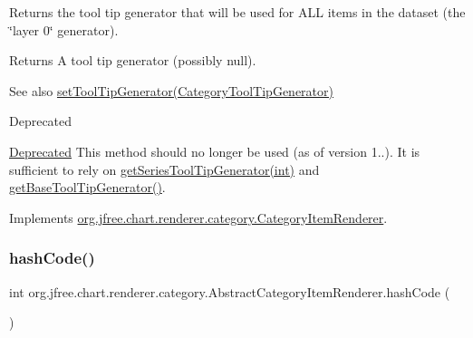 Returns the tool tip generator that will be used for A\+LL items in the dataset (the \char`\"{}layer 0\char`\"{} generator).

\begin{DoxyReturn}{Returns}
A tool tip generator (possibly {\ttfamily null}).
\end{DoxyReturn}
\begin{DoxySeeAlso}{See also}
\mbox{\hyperlink{classorg_1_1jfree_1_1chart_1_1renderer_1_1category_1_1_abstract_category_item_renderer_a19ad9dfc587403a06c97595c3f28800a}{set\+Tool\+Tip\+Generator(\+Category\+Tool\+Tip\+Generator)}}
\end{DoxySeeAlso}
\begin{DoxyRefDesc}{Deprecated}
\item[\mbox{\hyperlink{deprecated__deprecated000150}{Deprecated}}]This method should no longer be used (as of version 1..). It is sufficient to rely on \mbox{\hyperlink{classorg_1_1jfree_1_1chart_1_1renderer_1_1category_1_1_abstract_category_item_renderer_aacaf1b8c18bb07c8394b00a416f276ba}{get\+Series\+Tool\+Tip\+Generator(int)}} and \mbox{\hyperlink{classorg_1_1jfree_1_1chart_1_1renderer_1_1category_1_1_abstract_category_item_renderer_a17fbafe110567ad2f86b1512fb4bd6f2}{get\+Base\+Tool\+Tip\+Generator()}}. \end{DoxyRefDesc}


Implements \mbox{\hyperlink{interfaceorg_1_1jfree_1_1chart_1_1renderer_1_1category_1_1_category_item_renderer_a887b874ffbaafb55216058196012b320}{org.\+jfree.\+chart.\+renderer.\+category.\+Category\+Item\+Renderer}}.

\mbox{\label{classorg_1_1jfree_1_1chart_1_1renderer_1_1category_1_1_abstract_category_item_renderer_ad20cb3cd11aac243c3ca77b6e5f5fca6}} 
\subsubsection{\texorpdfstring{hash\+Code()}{hashCode()}}
{\footnotesize\ttfamily int org.\+jfree.\+chart.\+renderer.\+category.\+Abstract\+Category\+Item\+Renderer.\+hash\+Code (\begin{DoxyParamCaption}{ }\end{DoxyParamCaption})}

